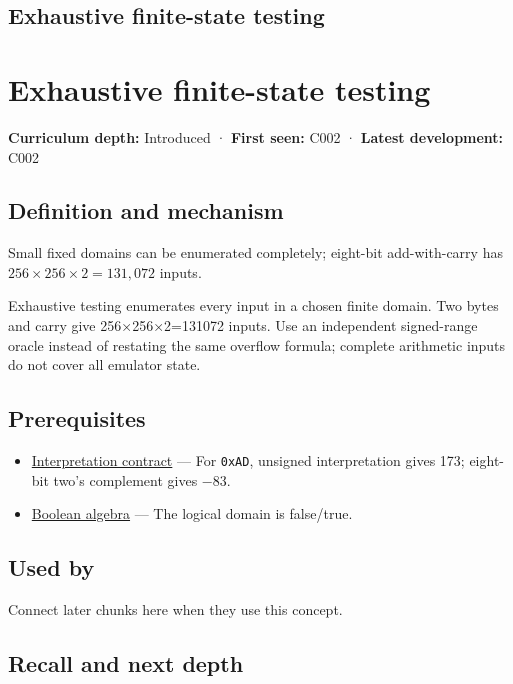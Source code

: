 \hypertarget{appendix-05db24ccc28a}{}
\section*{Exhaustive finite-state testing}
\chapter{Exhaustive finite-state testing}\label{appendix-05db24ccc28a-exhaustive-finite-state-testing}

\textbf{Curriculum depth:} Introduced · \textbf{First seen:} C002 · \textbf{Latest development:} C002

\section{Definition and mechanism}\label{appendix-05db24ccc28a-definition-and-mechanism}

Small fixed domains can be enumerated completely; eight-bit add-with-carry has \(256\times256\times2=131{,}072\) inputs.

Exhaustive testing enumerates every input in a chosen finite domain. Two bytes and carry give 256×256×2=131072 inputs. Use an independent signed-range oracle instead of restating the same overflow formula; complete arithmetic inputs do not cover all emulator state.

\section{Prerequisites}\label{appendix-05db24ccc28a-prerequisites}

\begin{itemize}
\tightlist
\item
  \hyperref[appendix-f414bd4ed05c]{Interpretation contract} --- For \texttt{0xAD}, unsigned interpretation gives 173; eight-bit two's complement gives −83.
\item
  \hyperref[appendix-24475e1596a8]{Boolean algebra} --- The logical domain is false/true.
\end{itemize}

\section{Used by}\label{appendix-05db24ccc28a-used-by}

Connect later chunks here when they use this concept.

\section{Recall and next depth}\label{appendix-05db24ccc28a-recall-and-next-depth}

